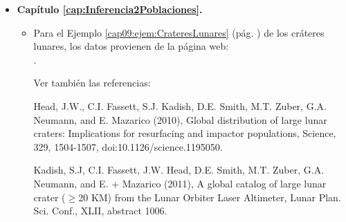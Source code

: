 \begin{itemize}
  \item[] {\bf Capítulo \ref{cap:Inferencia2Poblaciones}.}
      \begin{itemize}
      \item Para el Ejemplo \ref{cap09:ejem:CrateresLunares} (pág. \pageref{cap09:ejem:CrateresLunares}) de los cráteres lunares, los datos provienen de la página web:\\ .

        Ver también las referencias:

        Head, J.W., C.I. Fassett, S.J. Kadish, D.E. Smith, M.T. Zuber, G.A. Neumann, and E.
        Mazarico (2010), Global distribution of large lunar craters: Implications for
        resurfacing and impactor populations, Science, 329, 1504-1507,
        doi:10.1126/science.1195050.

        Kadish, S.J, C.I. Fassett, J.W. Head, D.E. Smith, M.T. Zuber, G.A. Neumann, and E. +
        Mazarico (2011), A global catalog of large lunar crater ($\geq$20 KM) from the Lunar
        Orbiter Laser Altimeter, Lunar Plan. Sci. Conf., XLII, abstract 1006.

        \end{itemize}


\end{itemize}

